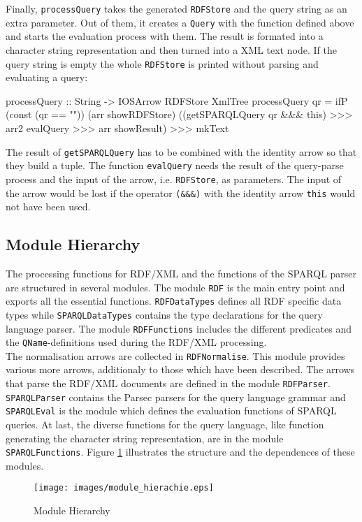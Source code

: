 \documentclass[11pt,a4paper,headsepline, bibtotoc]{scrreprt}
\begin{document}
Finally, \texttt{processQuery} takes the generated \texttt{RDFStore} and the query string as an extra parameter. Out of them, it creates a \texttt{Query} with the function defined above and starts the evaluation process with them. The result is formated into a character string representation and then turned into a XML text node. If the query string is empty the whole \texttt{RDFStore} is printed without parsing and evaluating a query:
\begin{code}
processQuery :: String -> IOSArrow RDFStore XmlTree 
processQuery qr = ifP (const (qr == ""))
                      (arr showRDFStore)
                      ((getSPARQLQuery qr &&& this) 
                        >>> arr2 evalQuery 
                        >>> arr showResult)
                  >>> mkText
\end{code}
The result of \texttt{getSPARQLQuery} has to be combined with the identity arrow so that they build a tuple. The function \texttt{evalQuery} needs the result of the query-parse process and the input of the arrow, i.e. \texttt{RDFStore}, as parameters. The input of the arrow would be lost if the operator \texttt{(\&\&\&)} with the identity arrow \texttt{this} would not have been used.
\subsection{Module Hierarchy}
The processing functions for RDF/XML and the functions of the SPARQL parser are structured in several modules. The module \texttt{RDF} is the main entry point and exports all the essential functions. \texttt{RDFDataTypes} defines all RDF specific data types while \texttt{SPARQLDataTypes} contains the type declarations for the query language parser. The module \texttt{RDFFunctions} includes the different predicates and the \texttt{QName}-definitions used during the RDF/XML processing.\\
The normalisation arrows are collected in \texttt{RDFNormalise}. This module provides various more arrows, additionaly to those which have been described. The arrows that parse the RDF/XML documents are defined in the module \texttt{RDFParser}. \texttt{SPARQLParser} contains the Parsec parsers for the query language grammar and \texttt{SPARQLEval} is the module which defines the evaluation functions of SPARQL queries. At last, the diverse functions for the query language, like function generating the character string representation, are in the module \texttt{SPARQLFunctions}. Figure \ref{hierarchy} illustrates the structure and the dependences of these modules.
\enlargethispage*{5cm}
\begin{figure}[H]
        \captionsetup{font=sf,labelfont=bf, justification=raggedright,singlelinecheck=false,aboveskip=7pt,belowskip=7pt}
        \caption{Module Hierarchy}
        \label{hierarchy}
        \texttt{[image: images/module\_hierachie.eps]}
\end{figure}   
\end{document}
